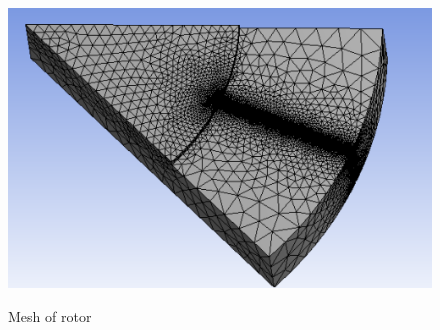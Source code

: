 \documentclass[11pt]{article}
\begin{document}
   \begin{center}
 \begin{figure}[H]
 \centering
 \includegraphics[scale=1]{rotormesh.png}\\
 \caption{Mesh of rotor}
 \end{figure}
 \end{center}
 
\end{document}
